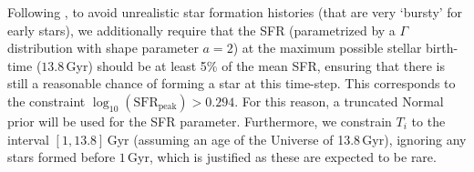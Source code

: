 \documentclass{aa}
\begin{document}

Following \citet{Philcox_2019}, to avoid unrealistic star formation histories (that are very `bursty' for early stars), we additionally require that the SFR (parametrized by a $\Gamma$ distribution with shape parameter $a=2$) at the maximum possible stellar birth-time ($13.8$\,Gyr) should be at least 5\% of the mean SFR, ensuring that there is still a reasonable chance of forming a star at this time-step. This corresponds to the constraint $\log_{10}\left(\mathrm{SFR}_\mathrm{peak}\right)>0.294$. For this reason, a truncated Normal prior will be used for the SFR parameter. Furthermore, we constrain $T_i$ to the interval $[1,13.8]$\,Gyr (assuming an age of the Universe of 13.8\,Gyr), ignoring any stars formed before $1$\,Gyr, which is justified as these are expected to be rare.
%
\end{document}
